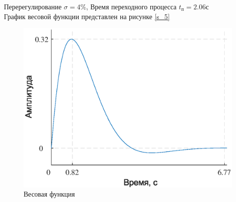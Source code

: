 \documentclass[a4paper,12pt]{article}
\begin{document}
	Перерегулирование $\sigma=4$\%, Время переходного процесса $t_\text{п}=2.06$с \\

График весовой функции представлен на рисунке \ref{s_5} 
\begin{figure}[h!]
	\begin{center}
		\includegraphics[width=5in]{ves.eps}
		
	\end{center}
	\caption{Весовая функция}
	\label{s_6}  
\end{figure}
	
	\newpage
\end{document}
